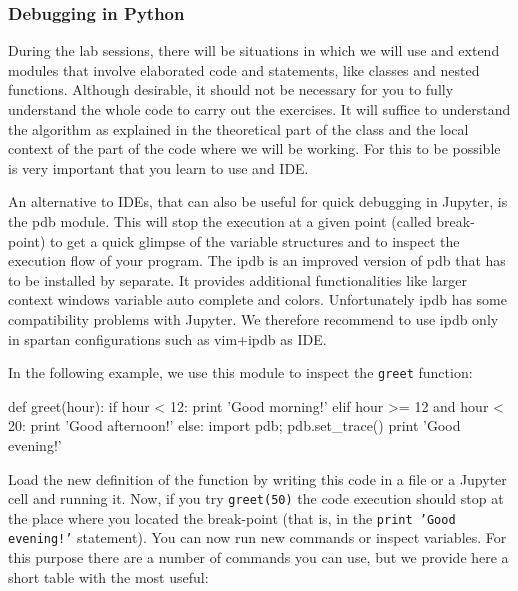 \subsubsection{Debugging in Python}

During the lab sessions, there will be situations in which we will use and extend modules that involve elaborated code and statements, like classes and nested functions. Although desirable, it should not be necessary for you to fully understand the whole code to carry out the exercises. It will suffice to understand the algorithm as explained in the theoretical part of the class and the local context of the part of the code where we will be working. For this to be possible is very important that you learn to use and IDE. 

An alternative to IDEs, that can also be useful for quick debugging in Jupyter, is the pdb module. This will stop the execution at a given point (called break-point) to get a quick glimpse of the variable structures and to inspect the execution flow of your program. The ipdb is an improved version of pdb that has to be installed by separate. It provides additional functionalities like larger context windows variable auto complete and colors. Unfortunately ipdb has some compatibility problems with Jupyter. We therefore recommend to use ipdb only in spartan configurations such as vim+ipdb as IDE.

\noindent In the following example, we use this module to inspect the \texttt{greet} function:

\begin{python}
def greet(hour):
    if hour < 12:
        print 'Good morning!'
    elif hour >= 12 and hour < 20:
        print 'Good afternoon!'
    else:
        import pdb; pdb.set_trace()
        print 'Good evening!'
\end{python}

Load the new definition of the function by writing this code in a file or a Jupyter cell and running it. Now, if you try \texttt{greet(50)} the code execution should stop at the place where you located the break-point (that is, in the \texttt{print 'Good evening!'} statement). You can now run new commands or inspect variables. For this purpose there are a number of commands you can use\footnotemark{}, but we provide here a short table with the most useful: 

